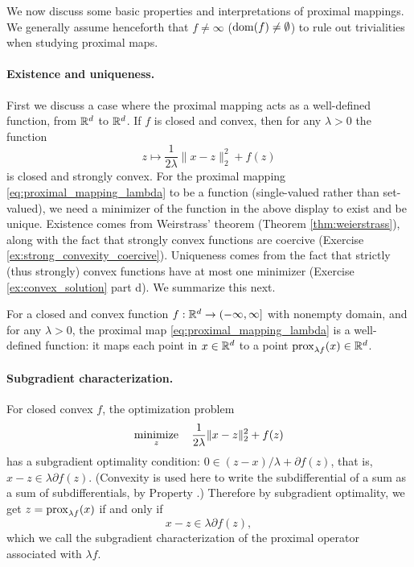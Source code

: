 We now discuss some basic properties and interpretations of proximal
mappings. We generally assume henceforth that $f \not= \infty$ ($\operatorname{dom}(f) \not= 
\emptyset$) to rule out trivialities when studying proximal maps.      

\paragraph{Existence and uniqueness.}

First we discuss a case where the proximal mapping acts as a well-defined 
function, from $\mathbb{R}^d$ to $\mathbb{R}^d$. If $f$ is closed and convex, then for any
$\lambda > 0$ the function    
\[
z \mapsto \frac{1}{2\lambda} \|x - z\|_2^2 + f(z)
\]
is closed and strongly convex. For the proximal mapping
\eqref{eq:proximal_mapping_lambda} to be a function (single-valued rather than
set-valued), we need a minimizer of the function in the above display to exist
and be unique. Existence comes from Weirstrass' theorem (Theorem
\ref{thm:weierstrass}), along with the fact that strongly convex functions are
coercive (Exercise \ref{ex:strong_convexity_coercive}). Uniqueness comes from
the fact that strictly (thus strongly) convex functions have at most one
minimizer (Exercise \ref{ex:convex_solution} part d). We summarize this next. 

\begin{Theorem}
\label{thm:proximal_existence_uniqueness}
For a closed and convex function $f : \mathbb{R}^d \to (-\infty, \infty]$ with nonempty
domain, and for any $\lambda > 0$, the proximal map
\eqref{eq:proximal_mapping_lambda} is a well-defined function: it maps each
point in $x \in \mathbb{R}^d$ to a point $\operatorname{prox}_{\lambda f}(x) \in \mathbb{R}^d$.   
\end{Theorem}
\vspace{-3pt}

\paragraph{Subgradient characterization.}

For closed convex $f$, the optimization problem 
\[
\operatorname*{minimize}_z \quad \frac{1}{2\lambda} \|x - z\|_2^2 + f(z)
\]
has a subgradient optimality condition: $0 \in (z - x) / \lambda + \partial
f(z)$, that is, $x - z \in \lambda \partial f(z)$. (Convexity is used here to
write the subdifferential of a sum as a sum of subdifferentials, by Property 
.) Therefore by subgradient optimality, we get $z =
\operatorname{prox}_{\lambda f}(x)$ if and only if 
\begin{equation}
\label{eq:proximal_subgradient_characterization}
x - z \in \lambda \partial f(z),
\end{equation}
which we call the subgradient characterization of the proximal operator
associated with $\lambda f$. 

